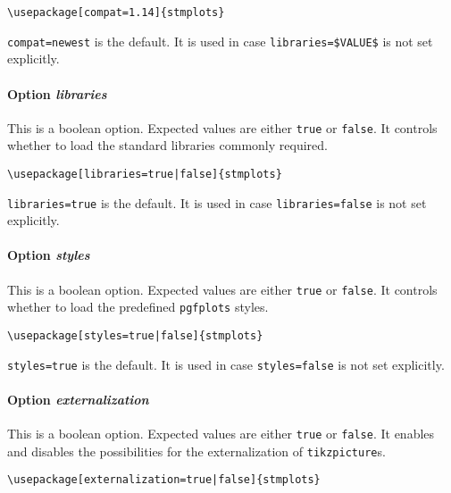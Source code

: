 \documentclass{scrartcl}
\begin{document}
\begin{verbatim}
\usepackage[compat=1.14]{stmplots}
\end{verbatim}

\texttt{compat=newest} is the default. It is used in case \verb+libraries=$VALUE$+ is not set explicitly.

\paragraph{Option \protect\textit{libraries}} 
\label{sec:usage:preamble:wholepackage:options:libraries}

This is a boolean option. Expected values are either \texttt{true} or \texttt{false}. It controls whether to load the standard libraries commonly required.

\begin{verbatim}
\usepackage[libraries=true|false]{stmplots}
\end{verbatim}

\texttt{libraries=true} is the default. It is used in case \texttt{libraries=false} is not set explicitly.

\paragraph{Option \protect\textit{styles}} 
\label{sec:usage:preamble:wholepackage:options:styles}

This is a boolean option. Expected values are either \texttt{true} or \texttt{false}. It controls whether to load the predefined \texttt{pgfplots} styles.

\begin{verbatim}
\usepackage[styles=true|false]{stmplots}
\end{verbatim}

\texttt{styles=true} is the default. It is used in case \texttt{styles=false} is not set explicitly.

\paragraph{Option \protect\textit{externalization}} 
\label{sec:usage:preamble:wholepackage:options:externalization}

This is a boolean option. Expected values are either \texttt{true} or \texttt{false}. It enables and disables the possibilities for the externalization of \texttt{tikzpicture}s.

\begin{verbatim}
\usepackage[externalization=true|false]{stmplots}
\end{verbatim}
\end{document}
